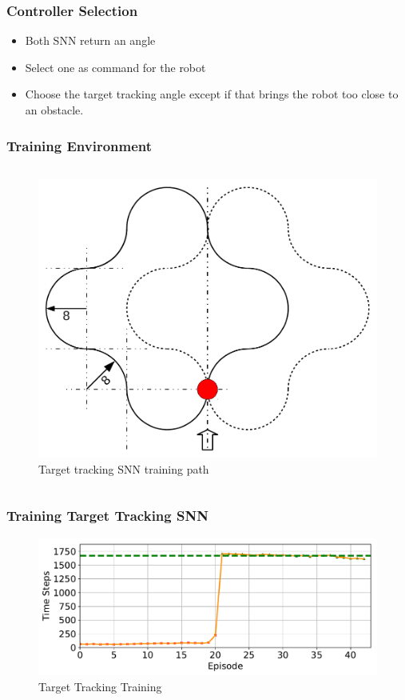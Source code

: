\begin{frame}
	\frametitle{Controller Selection}
	\begin{itemize}
		\item Both SNN return an angle
		\item Select one as command for the robot
		\item Choose the target tracking angle except if that brings the robot too close to an obstacle.
	\end{itemize}
\end{frame}

\begin{frame}
	\frametitle{Training Environment}
	\begin{columns}
		\column{\linewidth}
			\begin{overprint}
				\begin{figure}
					\centering
					\includegraphics[height=0.6\textheight]{img/tf_training_path.pdf}
					\caption{Target tracking SNN training path}
					\label{fig:tf_training_path}
				\end{figure}
			\end{overprint}
	\end{columns}
\end{frame}

\begin{frame}
	\frametitle{Training Target Tracking SNN}
	\begin{figure}
		\centering
		\includegraphics[width=\textwidth]{img/success_tf.pdf}
		\caption{Target Tracking Training}
		\label{fig:tf_success}
	\end{figure}
\end{frame}

